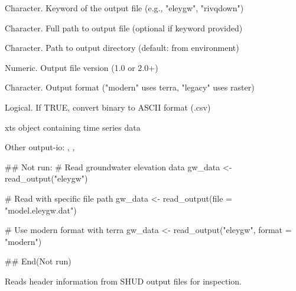 \documentclass[a4paper]{book}
\begin{document}
%
\begin{Arguments}
\begin{ldescription}
\item[\code{keyword}] Character. Keyword of the output file (e.g., "eleygw", "rivqdown")

\item[\code{file}] Character. Full path to output file (optional if keyword provided)

\item[\code{path}] Character. Path to output directory (default: from environment)

\item[\code{version}] Numeric. Output file version (1.0 or 2.0+)

\item[\code{format}] Character. Output format ("modern" uses terra, "legacy" uses raster)

\item[\code{ascii}] Logical. If TRUE, convert binary to ASCII format (.csv)
\end{ldescription}
\end{Arguments}
%
\begin{Value}
xts object containing time series data
\end{Value}
%
\begin{SeeAlso}\relax
Other output-io: 
,
,
\end{SeeAlso}
%
\begin{Examples}
\begin{ExampleCode}
## Not run: 
# Read groundwater elevation data
gw_data <- read_output("eleygw")

# Read with specific file path
gw_data <- read_output(file = "model.eleygw.dat")

# Use modern format with terra
gw_data <- read_output("eleygw", format = "modern")

## End(Not run)
\end{ExampleCode}
\end{Examples}
%
\begin{Description}\relax
Reads header information from SHUD output files for inspection.
\end{Description}
\end{document}
